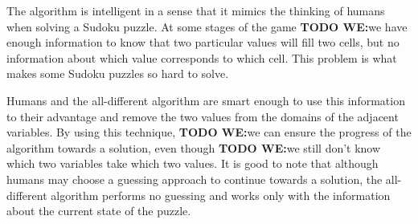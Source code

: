 \documentclass{l4proj}
\begin{document}
\noindent The algorithm is intelligent in a sense that it mimics the thinking of humans when solving a Sudoku puzzle. At some stages of the game \textbf{TODO WE:}we have enough information to know that two particular values will fill two cells, but no information about which value corresponds to which cell. This problem is what makes some Sudoku puzzles so hard to solve.

\noindent Humans and the all-different algorithm are smart enough to use this information to their advantage and remove the two values from the domains of the adjacent variables. By using this technique, \textbf{TODO WE:}we can ensure the progress of the algorithm towards a solution, even though \textbf{TODO WE:}we still don’t know which two variables take which two values. It is good to note that although humans may choose a guessing approach to continue towards a solution, the all-different algorithm performs no guessing and works only with the information about the current state of the puzzle.

\newpage
\end{document}
